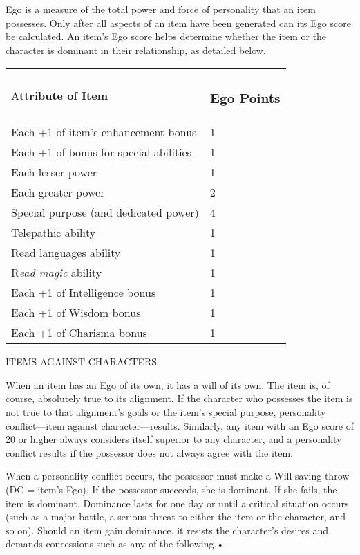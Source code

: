 \documentclass{article}
\begin{document}
Ego is a measure of the total power and force of personality that an item possesses. 
Only after all aspects of an item have been generated can its Ego score be calculated. 
An item's Ego score helps determine whether the item or the character is dominant 
in their relationship, as detailed below.

\vspace{12pt}
\begin{tabular}{|>{\raggedright}p{158pt}|>{\raggedright}p{49pt}|}
\hline
\multicolumn{2}{|p{207pt}|}{I\textbf{tem Ego}}\tabularnewline
\hline
A\textbf{ttribute of Item} & \subsubsection*{E\textbf{go Points}}\tabularnewline
\hline
Each +1 of item's enhancement bonus & 1\tabularnewline
\hline
Each +1 of bonus for special abilities & 1\tabularnewline
\hline
Each lesser power & 1\tabularnewline
\hline
Each greater power & 2\tabularnewline
\hline
Special purpose (and dedicated power) & 4\tabularnewline
\hline
Telepathic ability & 1\tabularnewline
\hline
Read languages ability & 1\tabularnewline
\hline
R\textit{ead magic }ability & 1\tabularnewline
\hline
Each +1 of Intelligence bonus & 1\tabularnewline
\hline
Each +1 of Wisdom bonus & 1\tabularnewline
\hline
Each +1 of Charisma bonus & 1\tabularnewline
\hline
\end{tabular}

\vspace{12pt}
ITEMS AGAINST CHARACTERS

When an item has an Ego of its own, it has a will of its own. The item is, of course, 
absolutely true to its alignment. If the character who possesses the item is not 
true to that alignment's goals or the item's special purpose, personality conflict---item 
against character---results. Similarly, any item with an Ego score of 20 or higher 
always considers itself superior to any character, and a personality conflict results 
if the possessor does not always agree with the item.

When a personality conflict occurs, the possessor must make a Will saving throw 
(DC = item's Ego). If the possessor succeeds, she is dominant. If she fails, the 
item is dominant. Dominance lasts for one day or until a critical situation occurs 
(such as a major battle, a serious threat to either the item or the character, 
and so on). Should an item gain dominance, it resists the character's desires and 
demands concessions such as any of the following.• 
\end{document}
